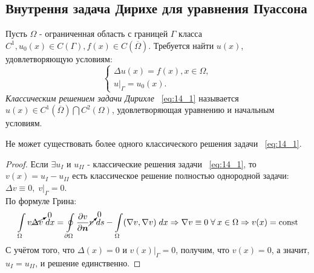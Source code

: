 \subsection{Внутрення задача Дирихе для уравнения Пуассона}
Пусть $\Omega$ - ограниченная область с границей $\Gamma$ класса $C^1, u_0(x) \in C(\Gamma), f(x) \in C(\overline{\Omega})$. Требуется найти $u(x)$, удовлетворяющую условиям:
\begin{equation}
\label{eq:14_1}
	\begin{cases}
		\Delta u(x) = f(x), x \in \Omega, \\
		u\bigr|_{\Gamma} = u_0(x).
	\end{cases}
\end{equation}
\textit{Классическим решением задачи Дирихле} ~\ref{eq:14_1} называется $u(x) \in C^1(\overline{\Omega}) \bigcap C^2({\Omega})$, удовлетворяющая уравнению и начальным условиям. \\
\begin{lemma}
Не может существовать более одного классического решения задачи ~\ref{eq:14_1}.
\end{lemma}
\begin{proof}
Если $\exists u_{I}$ и $u_{II}$ - классические решения задачи ~\ref{eq:14_1}, то $v(x) = u_{I} - u_{II}$ есть классическое решение полностью однородной задачи: $\Delta v \equiv 0,\; v\bigr|_{\Gamma} = 0$. \\
По формуле Грина:
\begin{equation*}
	\int\limits_{\Omega} v\cancelto{0}{\Delta v}\; dx = \oint\limits_{\partial \Omega}\dfrac{\partial v}{\partial \vec{n}}\cancelto{0}{v}\;ds - \int\limits_{\Omega}(\nabla v, \nabla v)\;dx \Rightarrow \nabla v \equiv 0 \forall x \in \Omega \Rightarrow v(x) = \text{const}
\end{equation*}
С учётом того, что $\Delta(x) = 0$ и $v(x)\bigr|_{\Gamma} = 0$, получим, что $v(x) = 0$, а значит, $u_{I} = u_{II}$, и решение единственно.
\end{proof}

